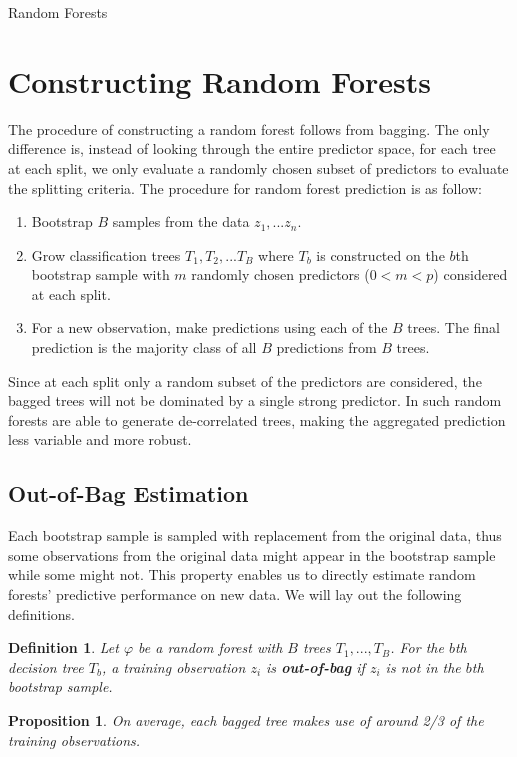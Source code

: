 \documentclass[12pt]{pom_thesis}
\newtheorem{definition}{Definition}[section]
\newtheorem{proposition}{Proposition}[section]
\begin{document}
\begin{chapter}{Random Forests}
\section {Constructing Random Forests}
The procedure of constructing a random forest follows from bagging. The only difference is, instead of looking through the entire predictor space, for each tree at each split, we only evaluate a randomly chosen subset of predictors to evaluate the splitting criteria. The procedure for random forest prediction is as follow:
\begin{enumerate}
    \item Bootstrap $B$ samples from the data $z_1,...z_n$.
    \item Grow classification trees $T_1, T_2,... T_B$ where $T_b$ is constructed on the $b$th bootstrap sample with $m$ randomly chosen predictors ($0<m<p$) considered at each split. 
    \item For a new observation, make predictions using each of the $B$ trees. The final prediction is the majority class of all $B$ predictions from $B$ trees.
\end{enumerate}

Since at each split only a random subset of the predictors are considered, the bagged trees will not be dominated by a single strong predictor. In such random forests are able to generate de-correlated trees, making the aggregated prediction less variable and more robust.  

\subsection{Out-of-Bag Estimation}
Each bootstrap sample is sampled with replacement from the original data, thus some observations from the original data might appear in the bootstrap sample while some might not. This property enables us to directly estimate random forests' predictive performance on new data. We will lay out the following definitions.

\begin{definition}
\label{oob-def}
Let $\varphi$ be a random forest with $B$ trees $T_1,...,T_B$. For the $b$th decision tree $T_b$, a training observation $z_i$ is \textbf{out-of-bag} if $z_i$ is not in the $b$th bootstrap sample.
\end{definition}

\begin{proposition}
\label{one-third}
On average, each bagged tree makes use of around 2/3 of the training observations. 
\end{proposition}


\end{chapter}
\end{document}
